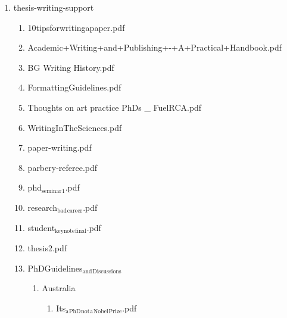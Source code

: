 \documentclass[11pt]{article}
\begin{document}
\begin{enumerate}

\item thesis-writing-support
\label{sec-1-1-1-1-8-8}
\begin{enumerate}
\item 10tipsforwritingapaper.pdf
\label{sec-1-1-1-1-8-8-1}

\item Academic+Writing+and+Publishing+-+A+Practical+Handbook.pdf
\label{sec-1-1-1-1-8-8-2}

\item BG Writing History.pdf
\label{sec-1-1-1-1-8-8-3}

\item FormattingGuidelines.pdf
\label{sec-1-1-1-1-8-8-4}

\item Thoughts on art practice PhDs \_ FuelRCA.pdf
\label{sec-1-1-1-1-8-8-5}

\item WritingInTheSciences.pdf
\label{sec-1-1-1-1-8-8-6}

\item paper-writing.pdf
\label{sec-1-1-1-1-8-8-7}

\item parbery-referee.pdf
\label{sec-1-1-1-1-8-8-8}

\item phd$_{\text{seminar}}$$_{\text{1}}$.pdf
\label{sec-1-1-1-1-8-8-9}

\item research$_{\text{bad}}$$_{\text{career}}$.pdf
\label{sec-1-1-1-1-8-8-10}

\item student$_{\text{keynote}}$$_{\text{final}}$.pdf
\label{sec-1-1-1-1-8-8-11}

\item thesis2.pdf
\label{sec-1-1-1-1-8-8-12}

\item PhDGuidelines$_{\text{and}}$$_{\text{Discussions}}$
\label{sec-1-1-1-1-8-8-13}
\begin{enumerate}
\item Australia
\label{sec-1-1-1-1-8-8-13-1}
\begin{enumerate}
\item Its$_{\text{a}}$$_{\text{PhD}}$$_{\text{not}}$$_{\text{a}}$$_{\text{Nobel}}$$_{\text{Prize}}$.pdf
\label{sec-1-1-1-1-8-8-13-1-1}


\end{enumerate}
\end{enumerate}
\end{enumerate}
\end{enumerate}
\end{document}
